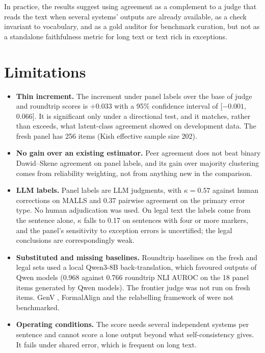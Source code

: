 \documentclass[11pt,letterpaper]{article}
\begin{document}
In practice, the results suggest using agreement as a complement to a judge that reads the text when several systems' outputs are already available, as a check invariant to vocabulary, and as a gold auditor for benchmark curation, but not as a standalone faithfulness metric for long text or text rich in exceptions.

\section{Limitations}
\label{sec:limitations}

\begin{itemize}
  \item \textbf{Thin increment.} The increment under panel labels over the base of judge and roundtrip scores is $+0.033$ with a 95\% confidence interval of [$-0.001$, 0.066]. It is significant only under a directional test, and it matches, rather than exceeds, what latent-class agreement showed on development data. The fresh panel has 256 items (Kish effective sample size 202).
  \item \textbf{No gain over an existing estimator.} Peer agreement does not beat binary Dawid--Skene agreement on panel labels, and its gain over majority clustering comes from reliability weighting, not from anything new in the comparison.
  \item \textbf{LLM labels.} Panel labels are LLM judgments, with $\kappa = 0.57$ against human corrections on MALLS and 0.37 pairwise agreement on the primary error type. No human adjudication was used. On legal text the labels come from the sentence alone, $\kappa$ falls to 0.17 on sentences with four or more markers, and the panel's sensitivity to exception errors is uncertified; the legal conclusions are correspondingly weak.
  \item \textbf{Substituted and missing baselines.} Roundtrip baselines on the fresh and legal sets used a local Qwen3-8B back-translation, which favoured outputs of Qwen models (0.968 against 0.766 roundtrip NLI AUROC on the 18 panel items generated by Qwen models). The frontier judge was not run on fresh items. GenV \citep{Singh2026}, FormalAlign \citep{Lu2024} and the relabelling framework of \citet{Brunello2026} were not benchmarked.
  \item \textbf{Operating conditions.} The score needs several independent systems per sentence and cannot score a lone output beyond what self-consistency gives. It fails under shared error, which is frequent on long text.

\end{itemize}
\end{document}
